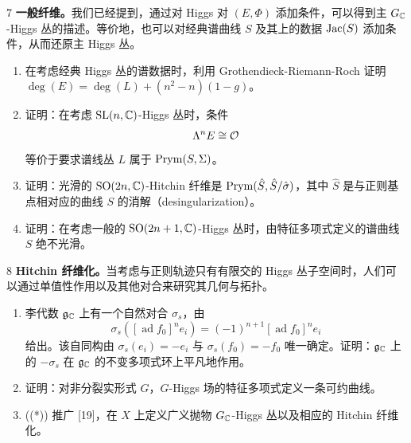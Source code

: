 
\begin{prob}{7}
\textbf{一般纤维。}我们已经提到，通过对 Higgs 对 $(E,\Phi)$ 添加条件，可以得到主 $G_{\mathbb{C}}$-Higgs 丛的描述。等价地，也可以对经典谱曲线 $S$ 及其上的数据 $\operatorname{Jac}(S)$ 添加条件，从而还原主 Higgs 丛。

\begin{enumerate}[label=(\roman*),leftmargin=2.2em]
\item 在考虑经典 Higgs 丛的谱数据时，利用 Grothendieck-Riemann-Roch 证明 $\deg(E)=\deg(L)+(n^2-n)(1-g)$。
\item 证明：在考虑 $\mathrm{SL}(n,\mathbb{C})$-Higgs 丛时，条件
\[
\Lambda^nE\cong\mathcal{O}
\]
等价于要求谱线丛 $L$ 属于 $\operatorname{Prym}(S,\Sigma)$。
\item 证明：光滑的 $\mathrm{SO}(2n,\mathbb{C})$-Hitchin 纤维是 $\operatorname{Prym}(\hat S,\hat S/\hat\sigma)$，其中 $\hat S$ 是与正则基点相对应的曲线 $S$ 的消解（desingularization）。
\item 证明：在考虑一般的 $\mathrm{SO}(2n+1,\mathbb{C})$-Higgs 丛时，由特征多项式定义的谱曲线 $S$ 绝不光滑。
\end{enumerate}
\end{prob}



\begin{prob}{8}
\textbf{Hitchin 纤维化。}当考虑与正则轨迹只有有限交的 Higgs 丛子空间时，人们可以通过单值性作用以及其他对合来研究其几何与拓扑。


\begin{enumerate}[label=(\roman*),leftmargin=2.2em]
\item 李代数 $\mathfrak{g}_{\mathbb{C}}$ 上有一个自然对合 $\sigma_s$，由
\[
\sigma_s([\operatorname{ad}f_0]^n e_i)=(-1)^{n+1}[\operatorname{ad}f_0]^n e_i
\]
给出。该自同构由 $\sigma_s(e_i)=-e_i$ 与 $\sigma_s(f_0)=-f_0$ 唯一确定。证明：$\mathfrak{g}_{\mathbb{C}}$ 上的 $-\sigma_s$ 在 $\mathfrak{g}_{\mathbb{C}}$ 的不变多项式环上平凡地作用。
\item 证明：对非分裂实形式 $G$，$G$-Higgs 场的特征多项式定义一条可约曲线。
\item ((*)) 推广 [19]，在 $X$ 上定义广义抛物 $G_{\mathbb{C}}$-Higgs 丛以及相应的 Hitchin 纤维化。
\end{enumerate}
\end{prob}

